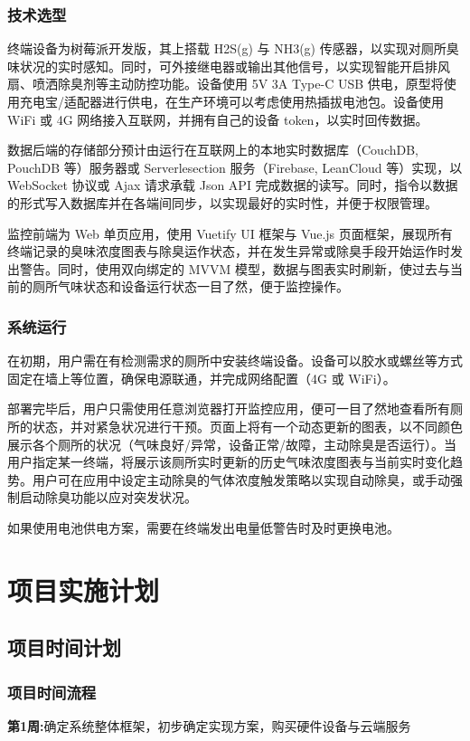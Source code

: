 \documentclass[degree=course]{sjtuthesis}
\begin{document}
\subsection{技术选型}
终端设备为树莓派开发版，其上搭载 H2S(g) 与 NH3(g) 传感器，以实现对厕所臭味状况的实时感知。同时，可外接继电器或输出其他信号，以实现智能开启排风扇、喷洒除臭剂等主动防控功能。设备使用 5V 3A Type-C USB 供电，原型将使用充电宝/适配器进行供电，在生产环境可以考虑使用热插拔电池包。设备使用 WiFi 或 4G 网络接入互联网，并拥有自己的设备 token，以实时回传数据。

数据后端的存储部分预计由运行在互联网上的本地实时数据库（Couch\-DB, PouchDB 等）服务器或 Serverlesection 服务（Firebase, LeanCloud 等）实现，以 WebSocket 协议或 Ajax 请求承载 Json API 完成数据的读写。同时，指令以数据的形式写入数据库并在各端间同步，以实现最好的实时性，并便于权限管理。

监控前端为 Web 单页应用，使用 Vuetify UI 框架与 Vue.js 页面框架，展现所有终端记录的臭味浓度图表与除臭运作状态，并在发生异常或除臭手段开始运作时发出警告。同时，使用双向绑定的 MVVM 模型，数据与图表实时刷新，使过去与当前的厕所气味状态和设备运行状态一目了然，便于监控操作。
\subsection{系统运行}
在初期，用户需在有检测需求的厕所中安装终端设备。设备可以胶水或螺丝等方式固定在墙上等位置，确保电源联通，并完成网络配置（4G 或 WiFi）。

部署完毕后，用户只需使用任意浏览器打开监控应用，便可一目了然地查看所有厕所的状态，并对紧急状况进行干预。页面上将有一个动态更新的图表，以不同颜色展示各个厕所的状况（气味良好/异常，设备正常/故障，主动除臭是否运行）。当用户指定某一终端，将展示该厕所实时更新的历史气味浓度图表与当前实时变化趋势。用户可在应用中设定主动除臭的气体浓度触发策略以实现自动除臭，或手动强制启动除臭功能以应对突发状况。

如果使用电池供电方案，需要在终端发出电量低警告时及时更换电池。

\chapter{项目实施计划}
\section{项目时间计划}
\subsection{项目时间流程}
\textbf{第1周:}确定系统整体框架，初步确定实现方案，购买硬件设备与云端服务\\
\end{document}
